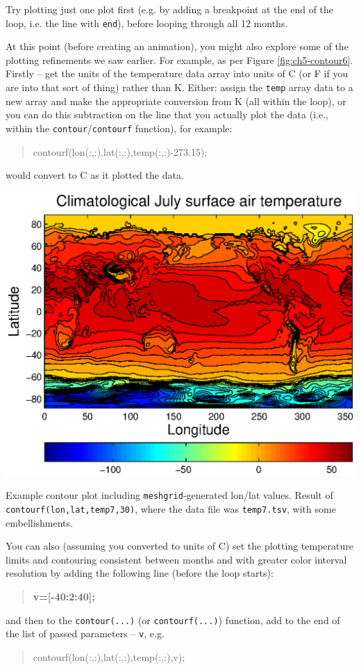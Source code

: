 \documentclass{tufte-book} %
\newenvironment{docspec}{\begin{quotation}\ttfamily\parskip0pt\parindent0pt\ignorespaces}{\end{quotation}}
\newenvironment{docspecbold}{\begin{quotation}\ttfamily\bfseries\parskip0pt\parindent0pt\ignorespaces}{\end{quotation}}
\begin{document}
Try plotting just one plot first (e.g. by adding a breakpoint at the end of the loop, i.e. the line with \texttt{end}), before looping through all 12 months. 

At this point (before creating an animation), you might also explore some of the plotting refinements we saw earlier. For example, as per Figure \ref{fig:ch5-contour6}. 
Firstly -- get the units of the temperature data array into units of \degree C (or \degree  F if you are into that sort of thing) rather than \degree K. Either: assign the \texttt{temp} array data to a new array and make the appropriate conversion from \degree K (all within the loop), or you can do this subtraction on the line that you actually plot the data (i.e., within the \texttt{contour}/\texttt{contourf} function), for example:
\begin{docspec}
contourf(lon(:,:),lat(:,:),temp(:,:)-273.15);
\end{docspec}
\noindent would convert to \degree C as it plotted the data.

\begin{marginfigure}[0.0in]
\includegraphics[width=\linewidth]{ch5-contour6.eps}
\caption{Example contour plot including \texttt{meshgrid}-generated lon/lat values. Result of \texttt{contourf(lon,lat,temp7,30)}, where the data file was \texttt{temp7.tsv}, with some embellishments.}
\label{fig:ch5-contour6}
\end{marginfigure}

You can also (assuming you converted to units of \degree C) set the plotting temperature limits and contouring consistent between months and with greater color interval resolution by adding the following line (before the loop starts):
\begin{docspecbold}
v=[-40:2:40];
\end{docspecbold}
\noindent and then to the \texttt{contour(...)} (or \texttt{contourf(...)}) function, add to the end of the list of passed parameters -- \texttt{v}, e.g.
\begin{docspec}
contourf(lon(:,:),lat(:,:),temp(:,:),v);
\end{docspec}
\end{document}
